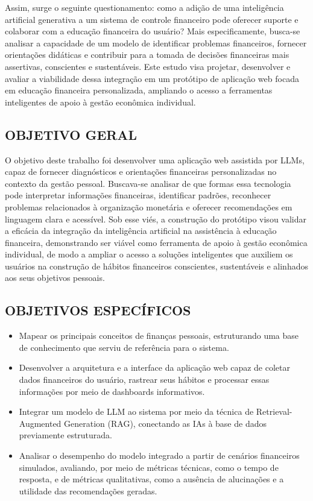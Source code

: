 \documentclass[12pt]{article}
\begin{document}
  Assim, surge o seguinte questionamento: como a adição de uma inteligência artificial generativa a um sistema de controle financeiro pode oferecer suporte e colaborar com a educação financeira do usuário? Mais especificamente, busca-se analisar a capacidade de um modelo de identificar problemas financeiros, fornecer orientações didáticas e contribuir para a tomada de decisões financeiras mais assertivas, conscientes e sustentáveis. Este estudo visa projetar, desenvolver e avaliar a viabilidade dessa integração em um protótipo de aplicação web focada em educação financeira personalizada, ampliando o acesso a ferramentas inteligentes de apoio à gestão econômica individual. 

\subsection{OBJETIVO GERAL}

  O objetivo deste trabalho foi desenvolver uma aplicação web assistida por LLMs, capaz de fornecer diagnósticos e orientações financeiras personalizadas no contexto da gestão pessoal. Buscava-se analisar de que formas essa tecnologia pode interpretar informações financeiras, identificar padrões, reconhecer problemas relacionados à organização monetária e oferecer recomendações em linguagem clara e acessível. Sob esse viés, a construção do protótipo visou validar a eficácia da integração da inteligência artificial na assistência à educação financeira, demonstrando ser viável como ferramenta de apoio à gestão econômica individual, de modo a ampliar o acesso a soluções inteligentes que auxiliem os usuários na construção de hábitos financeiros conscientes, sustentáveis e alinhados aos seus objetivos pessoais.

\subsection{OBJETIVOS ESPECÍFICOS}

  \begin{itemize}
    \item Mapear os principais conceitos de finanças pessoais, estruturando uma base de conhecimento que serviu de referência para o sistema.
    \item Desenvolver a arquitetura e a interface da aplicação web capaz de coletar dados financeiros do usuário, rastrear seus hábitos e processar essas informações por meio de dashboards informativos.
    \item Integrar um modelo de LLM ao sistema por meio da técnica de Retrieval-Augmented Generation (RAG), conectando as IAs à base de dados previamente estruturada.
    \item Analisar o desempenho do modelo integrado a partir de cenários financeiros simulados, avaliando, por meio de métricas técnicas, como o tempo de resposta, e de métricas qualitativas, como a ausência de alucinações e a utilidade das recomendações geradas.
  \end{itemize}
\end{document}

